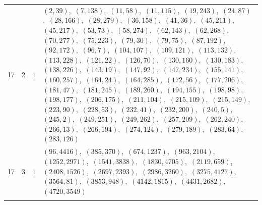 \documentclass[11pt]{article}
\begin{document}
\begin{longtable}{@{}rrl>{\raggedright\arraybackslash}p{}@{}}
17 & 2 & $1$ & $(2,39)$,\allowbreak\ $(7,138)$,\allowbreak\ $(11,58)$,\allowbreak\ $(11,115)$,\allowbreak\ $(19,243)$,\allowbreak\ $(24,87)$,\allowbreak\ $(28,166)$,\allowbreak\ $(28,279)$,\allowbreak\ $(36,158)$,\allowbreak\ $(41,36)$,\allowbreak\ $(45,211)$,\allowbreak\ $(45,217)$,\allowbreak\ $(53,73)$,\allowbreak\ $(58,274)$,\allowbreak\ $(62,143)$,\allowbreak\ $(62,268)$,\allowbreak\ $(70,277)$,\allowbreak\ $(75,223)$,\allowbreak\ $(79,30)$,\allowbreak\ $(79,75)$,\allowbreak\ $(87,192)$,\allowbreak\ $(92,172)$,\allowbreak\ $(96,7)$,\allowbreak\ $(104,107)$,\allowbreak\ $(109,121)$,\allowbreak\ $(113,132)$,\allowbreak\ $(113,228)$,\allowbreak\ $(121,22)$,\allowbreak\ $(126,70)$,\allowbreak\ $(130,160)$,\allowbreak\ $(130,183)$,\allowbreak\ $(138,226)$,\allowbreak\ $(143,19)$,\allowbreak\ $(147,92)$,\allowbreak\ $(147,234)$,\allowbreak\ $(155,141)$,\allowbreak\ $(160,257)$,\allowbreak\ $(164,24)$,\allowbreak\ $(164,285)$,\allowbreak\ $(172,56)$,\allowbreak\ $(177,206)$,\allowbreak\ $(181,47)$,\allowbreak\ $(181,245)$,\allowbreak\ $(189,260)$,\allowbreak\ $(194,155)$,\allowbreak\ $(198,98)$,\allowbreak\ $(198,177)$,\allowbreak\ $(206,175)$,\allowbreak\ $(211,104)$,\allowbreak\ $(215,109)$,\allowbreak\ $(215,149)$,\allowbreak\ $(223,90)$,\allowbreak\ $(228,53)$,\allowbreak\ $(232,41)$,\allowbreak\ $(232,200)$,\allowbreak\ $(240,5)$,\allowbreak\ $(245,2)$,\allowbreak\ $(249,251)$,\allowbreak\ $(249,262)$,\allowbreak\ $(257,209)$,\allowbreak\ $(262,240)$,\allowbreak\ $(266,13)$,\allowbreak\ $(266,194)$,\allowbreak\ $(274,124)$,\allowbreak\ $(279,189)$,\allowbreak\ $(283,64)$,\allowbreak\ $(283,126)$\\
17 & 3 & $1$ & $(96,4416)$,\allowbreak\ $(385,370)$,\allowbreak\ $(674,1237)$,\allowbreak\ $(963,2104)$,\allowbreak\ $(1252,2971)$,\allowbreak\ $(1541,3838)$,\allowbreak\ $(1830,4705)$,\allowbreak\ $(2119,659)$,\allowbreak\ $(2408,1526)$,\allowbreak\ $(2697,2393)$,\allowbreak\ $(2986,3260)$,\allowbreak\ $(3275,4127)$,\allowbreak\ $(3564,81)$,\allowbreak\ $(3853,948)$,\allowbreak\ $(4142,1815)$,\allowbreak\ $(4431,2682)$,\allowbreak\ $(4720,3549)$\\
\addlinespace[3pt]
\end{longtable}
\endgroup
\end{document}
